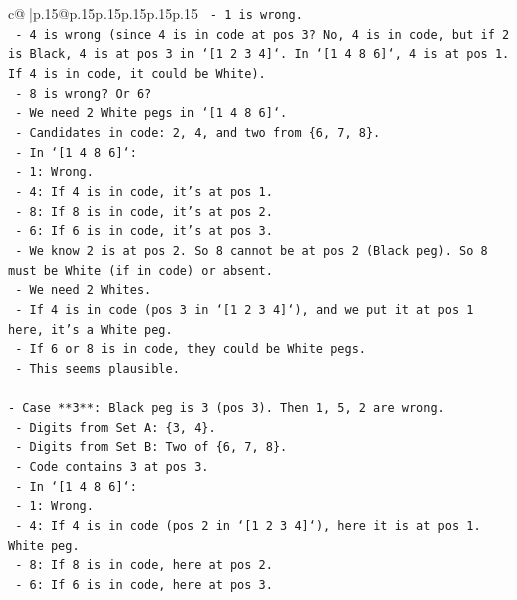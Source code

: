 \documentclass{article}
\begin{document}
{\begin{supertabular}{c@{$\;$}|p{.15\linewidth}@{}p{.15\linewidth}p{.15\linewidth}p{.15\linewidth}p{.15\linewidth}p{.15\linewidth}}
{{{\texttt{        {-} 1 is wrong.} \\
\texttt{        {-} 4 is wrong (since 4 is in code at pos 3? No, 4 is in code, but if 2 is Black, 4 is at pos 3 in `{[}1 2 3 4{]}`. In `{[}1 4 8 6{]}`, 4 is at pos 1. If 4 is in code, it could be White).} \\
\texttt{        {-} 8 is wrong? Or 6?} \\
\texttt{        {-} We need 2 White pegs in `{[}1 4 8 6{]}`.} \\
\texttt{        {-} Candidates in code: 2, 4, and two from \{6, 7, 8\}.} \\
\texttt{        {-} In `{[}1 4 8 6{]}`:} \\
\texttt{            {-} 1: Wrong.} \\
\texttt{            {-} 4: If 4 is in code, it's at pos 1.} \\
\texttt{            {-} 8: If 8 is in code, it's at pos 2.} \\
\texttt{            {-} 6: If 6 is in code, it's at pos 3.} \\
\texttt{        {-} We know 2 is at pos 2. So 8 cannot be at pos 2 (Black peg). So 8 must be White (if in code) or absent.} \\
\texttt{        {-} We need 2 Whites.} \\
\texttt{        {-} If 4 is in code (pos 3 in `{[}1 2 3 4{]}`), and we put it at pos 1 here, it's a White peg.} \\
\texttt{        {-} If 6 or 8 is in code, they could be White pegs.} \\
\texttt{        {-} This seems plausible.} \\
\\ 
\texttt{{-} Case **3**: Black peg is 3 (pos 3). Then 1, 5, 2 are wrong.} \\
\texttt{    {-} Digits from Set A: \{3, 4\}.} \\
\texttt{    {-} Digits from Set B: Two of \{6, 7, 8\}.} \\
\texttt{    {-} Code contains 3 at pos 3.} \\
\texttt{    {-} In `{[}1 4 8 6{]}`:} \\
\texttt{        {-} 1: Wrong.} \\
\texttt{        {-} 4: If 4 is in code (pos 2 in `{[}1 2 3 4{]}`), here it is at pos 1. White peg.} \\
\texttt{        {-} 8: If 8 is in code, here at pos 2.} \\
\texttt{        {-} 6: If 6 is in code, here at pos 3.} \\
}}}
\end{supertabular}}
\end{document}
